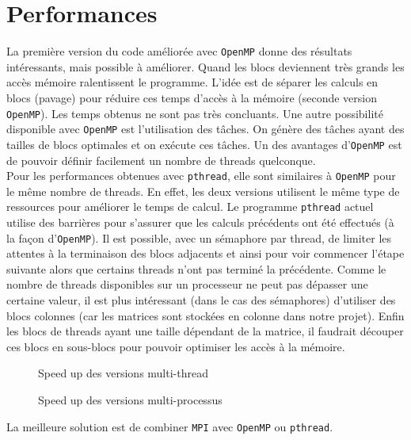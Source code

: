 \section{Performances} %
\label{sec:perf}

La première version du code améliorée avec \texttt{OpenMP} donne des résultats intéressants, mais possible à améliorer. Quand les blocs deviennent très grands les accès mémoire ralentissent le programme. L'idée est de séparer les calculs en blocs (pavage) pour réduire ces temps d'accès à la mémoire (seconde version \texttt{OpenMP}). Les temps obtenus ne sont pas très concluants. Une autre possibilité disponible avec \texttt{OpenMP} est l'utilisation des tâches. On génère des tâches ayant des tailles de blocs optimales et on exécute ces tâches. Un des avantages d'\texttt{OpenMP} est de pouvoir définir facilement un nombre de threads quelconque.\\

Pour les performances obtenues avec \texttt{pthread}, elle sont similaires à \texttt{OpenMP} pour le même nombre de threads. En effet, les deux versions utilisent le même type de ressources pour améliorer le temps de calcul. Le programme \texttt{pthread} actuel utilise des barrières pour s'assurer que les calculs précédents ont été effectués (à la façon d'\texttt{OpenMP}). Il est possible, avec un sémaphore par thread, de limiter les attentes à la terminaison des blocs adjacents et ainsi pour voir commencer l'étape suivante alors que certains threads n'ont pas terminé la précédente. Comme le nombre de threads disponibles sur un processeur ne peut pas dépasser une certaine valeur, il est plus intéressant (dans le cas des sémaphores) d'utiliser des blocs colonnes (car les matrices sont stockées en colonne dans notre projet). Enfin les blocs de threads ayant une taille dépendant de la matrice, il faudrait découper ces blocs en sous-blocs pour pouvoir optimiser les accès à la mémoire.

\begin{figure}[H]
\centering
\caption{Speed up des versions multi-thread}
\label{fig:sp-size}
\end{figure}



\begin{figure}[H]
\centering
\caption{Speed up des versions multi-processus}
\label{fig:sp-proc}
\end{figure}

La meilleure solution est de combiner \texttt{MPI} avec \texttt{OpenMP} ou \texttt{pthread}.

